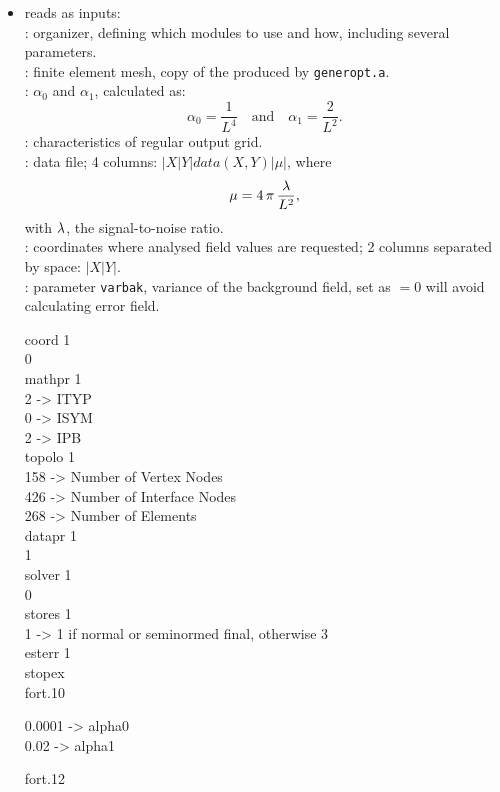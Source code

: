 \begin{itemize}	
    \item reads as inputs: \\								
	 	:			 organizer, defining which modules to use and how, including several parameters.\\				
		:			finite element mesh, copy of the  produced by \texttt{generopt.a}.\\					
	 	:			$\alpha_0$ and $\alpha_1$, calculated as: 
	 	\[\alpha_0=\frac{1}{L^{4}}\quad \textrm{and}  \quad  \alpha_1 =\frac{2}{L^{2}}.	\]				
	 	:			characteristics of regular output grid.\\					
		:			data file; 4 columns: $|X|Y|data(X,Y)|\mu|$, where  
		\[ \mu = 4\,\pi\,\frac{\lambda}{L^{2}},\]
	  with $\lambda$, the signal-to-noise ratio.	\\				
		:			coordinates where analysed field values are requested; 2 columns separated by space: $|X|Y|$. \\					
	 	:			parameter \texttt{varbak}, variance of the background field, set as $=0$ will avoid calculating error field.				

\begin{exfile}[H]
coord 1\\
0\\
mathpr 1\\
2  -> ITYP\\
0  -> ISYM\\
2  -> IPB\\
topolo 1\\
 158 -> Number of Vertex Nodes\\
 426 -> Number of Interface Nodes\\
 268 -> Number of Elements\\
datapr 1\\
1\\
solver 1\\
0\\
stores 1\\
1  -> 1 if normal or seminormed final, otherwise 3\\
esterr 1\\
stopex\\
\caption{fort.10}
\end{exfile}
	  
	  
\begin{exfile}[H]
0.0001  -> alpha0\\
0.02  -> alpha1
\caption{fort.12}
\end{exfile}


\end{itemize}
